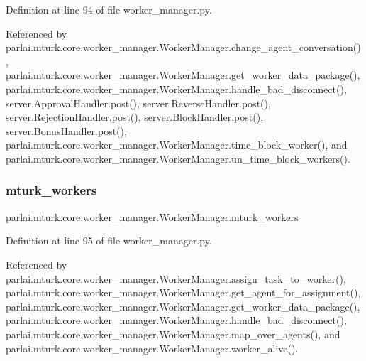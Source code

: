 Definition at line 94 of file worker\+\_\+manager.\+py.



Referenced by parlai.\+mturk.\+core.\+worker\+\_\+manager.\+Worker\+Manager.\+change\+\_\+agent\+\_\+conversation(), parlai.\+mturk.\+core.\+worker\+\_\+manager.\+Worker\+Manager.\+get\+\_\+worker\+\_\+data\+\_\+package(), parlai.\+mturk.\+core.\+worker\+\_\+manager.\+Worker\+Manager.\+handle\+\_\+bad\+\_\+disconnect(), server.\+Approval\+Handler.\+post(), server.\+Reverse\+Handler.\+post(), server.\+Rejection\+Handler.\+post(), server.\+Block\+Handler.\+post(), server.\+Bonus\+Handler.\+post(), parlai.\+mturk.\+core.\+worker\+\_\+manager.\+Worker\+Manager.\+time\+\_\+block\+\_\+worker(), and parlai.\+mturk.\+core.\+worker\+\_\+manager.\+Worker\+Manager.\+un\+\_\+time\+\_\+block\+\_\+workers().

\mbox{\label{classparlai_1_1mturk_1_1core_1_1worker__manager_1_1WorkerManager_a52976ae5dca085ae8398305c36e781b9}} 
\subsubsection{\texorpdfstring{mturk\+\_\+workers}{mturk\_workers}}
{\footnotesize\ttfamily parlai.\+mturk.\+core.\+worker\+\_\+manager.\+Worker\+Manager.\+mturk\+\_\+workers}



Definition at line 95 of file worker\+\_\+manager.\+py.



Referenced by parlai.\+mturk.\+core.\+worker\+\_\+manager.\+Worker\+Manager.\+assign\+\_\+task\+\_\+to\+\_\+worker(), parlai.\+mturk.\+core.\+worker\+\_\+manager.\+Worker\+Manager.\+get\+\_\+agent\+\_\+for\+\_\+assignment(), parlai.\+mturk.\+core.\+worker\+\_\+manager.\+Worker\+Manager.\+get\+\_\+worker\+\_\+data\+\_\+package(), parlai.\+mturk.\+core.\+worker\+\_\+manager.\+Worker\+Manager.\+handle\+\_\+bad\+\_\+disconnect(), parlai.\+mturk.\+core.\+worker\+\_\+manager.\+Worker\+Manager.\+map\+\_\+over\+\_\+agents(), and parlai.\+mturk.\+core.\+worker\+\_\+manager.\+Worker\+Manager.\+worker\+\_\+alive().

